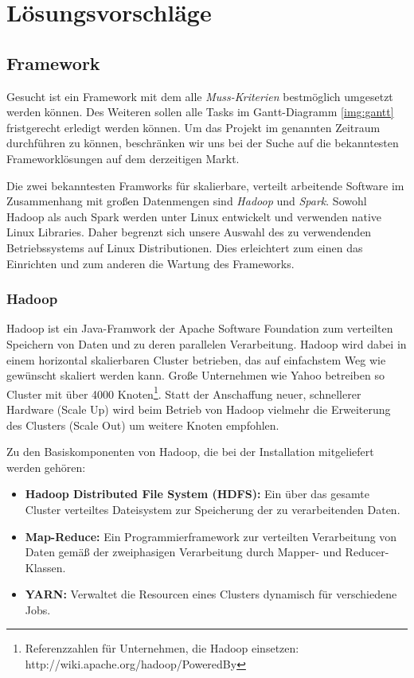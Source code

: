 \chapter{Lösungsvorschläge}
\label{cha:Lösungsvorschläge}

\section{Framework}
\label{sec:Framwork}

Gesucht ist ein Framework mit dem alle \textit{Muss-Kriterien} bestmöglich umgesetzt werden können. Des Weiteren sollen alle Tasks im Gantt-Diagramm \ref{img:gantt} fristgerecht erledigt werden können. Um das Projekt im genannten Zeitraum durchführen zu können, beschränken wir uns bei der Suche auf die bekanntesten Frameworklösungen auf dem derzeitigen Markt.

Die zwei bekanntesten Framworks für skalierbare, verteilt arbeitende Software im Zusammenhang mit großen Datenmengen sind \textit{Hadoop} und \textit{Spark}. Sowohl Hadoop als auch Spark werden unter Linux entwickelt und verwenden native Linux Libraries. Daher begrenzt sich unsere Auswahl des zu verwendenden Betriebssystems auf Linux Distributionen. Dies erleichtert zum einen das Einrichten und zum anderen die Wartung des Frameworks.

\subsection{Hadoop}
\label{subsec:Hadoop}

Hadoop ist ein Java-Framwork der Apache Software Foundation zum verteilten Speichern von Daten und zu deren parallelen Verarbeitung. Hadoop wird dabei in einem horizontal skalierbaren Cluster betrieben, das auf einfachstem Weg wie gewünscht skaliert werden kann. Große Unternehmen wie Yahoo betreiben so Cluster mit über 4000 Knoten\footnote{Referenzzahlen für Unternehmen, die Hadoop einsetzen: http://wiki.apache.org/hadoop/PoweredBy}. Statt der Anschaffung neuer, schnellerer Hardware (Scale Up) wird beim Betrieb von Hadoop vielmehr die Erweiterung des Clusters (Scale Out) um weitere Knoten empfohlen.

Zu den Basiskomponenten von Hadoop, die bei der Installation mitgeliefert werden gehören:

\begin{itemize}
\item \textbf{Hadoop Distributed File System (HDFS):} Ein über das gesamte Cluster verteiltes Dateisystem zur Speicherung der zu verarbeitenden Daten.
\item \textbf{Map-Reduce:} Ein Programmierframework zur verteilten Verarbeitung von Daten gemäß der zweiphasigen Verarbeitung durch Mapper- und Reducer-Klassen.
\item \textbf{YARN:} Verwaltet die Resourcen eines Clusters dynamisch für verschiedene Jobs. 
\end{itemize} 

